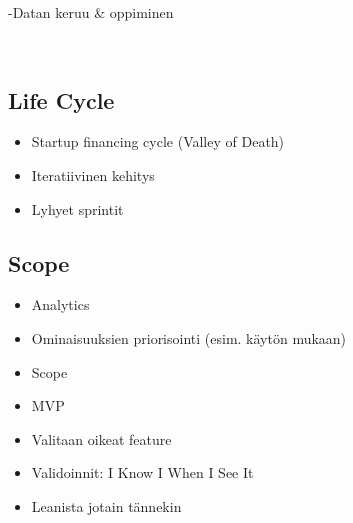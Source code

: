 -Datan keruu & oppiminen

~\cite{ries2011lean}

 \subsection{Life Cycle}

 \begin{itemize}

 \item Startup financing cycle (Valley of Death)
 \item Iteratiivinen kehitys
 \item Lyhyet sprintit
 
 \end{itemize}
 
 \subsection{Scope}
 
 \begin{itemize}
 
 \item Analytics
 \item Ominaisuuksien priorisointi (esim. käytön mukaan)
 \item Scope
 \item MVP
 \item Valitaan oikeat feature
 \item Validoinnit: I Know I When I See It
 \item Leanista jotain tännekin
 
 \end{itemize}
 